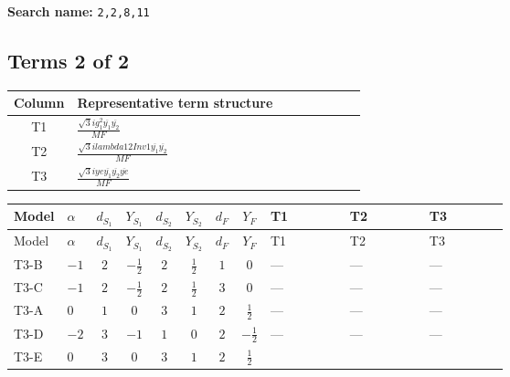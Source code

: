 \documentclass[8pt]{article}
\begin{document}
\begin{landscape}
\begin{longtable}{@{}llcccccc >{\raggedright\arraybackslash}p{0.21\linewidth} >{\raggedright\arraybackslash}p{0.21\linewidth} >{\raggedright\arraybackslash}p{0.21\linewidth}@{}}
\midrule
\bottomrule
\end{longtable}
\clearpage
\noindent\textbf{Search name: }\texttt{2,2,8,11}\par\smallskip
\subsection*{Terms 2 of 2}
\begin{center}
\begin{tabular}{@{}c >{\raggedright\arraybackslash}p{0.82\linewidth}@{}}
\toprule
Column & Representative term structure \\
\midrule
T1 & \(\displaystyle \frac{\sqrt{3} i g_{1}^{2} \overline{y_{1}} \overline{y_{2}}}{MF}\) \\
\midrule
T2 & \(\displaystyle \frac{\sqrt{3} i lambda12Inv1 \overline{y_{1}} \overline{y_{2}}}{MF}\) \\
\midrule
T3 & \(\displaystyle \frac{\sqrt{3} i ye \overline{y_{1}} \overline{y_{2}} \overline{ye}}{MF}\) \\
\midrule
\bottomrule
\end{tabular}
\end{center}
\smallskip
\tiny
\begin{longtable}{@{}llcccccc >{\raggedright\arraybackslash}p{0.21\linewidth} >{\raggedright\arraybackslash}p{0.21\linewidth} >{\raggedright\arraybackslash}p{0.21\linewidth}@{}}
\toprule
Model & $\alpha$ & $d_{S_1}$ & $Y_{S_1}$ & $d_{S_2}$ & $Y_{S_2}$ & $d_F$ & $Y_F$ & T1 & T2 & T3 \\
\midrule
\endfirsthead
\toprule
Model & $\alpha$ & $d_{S_1}$ & $Y_{S_1}$ & $d_{S_2}$ & $Y_{S_2}$ & $d_F$ & $Y_F$ & T1 & T2 & T3 \\
\midrule
\endhead
T3-B & $-1$ & $2$ & $-\frac{1}{2}$ & $2$ & $\frac{1}{2}$ & $1$ & $0$ & --- & --- & --- \\
\midrule
T3-C & $-1$ & $2$ & $-\frac{1}{2}$ & $2$ & $\frac{1}{2}$ & $3$ & $0$ & --- & --- & --- \\
\midrule
T3-A & $0$ & $1$ & $0$ & $3$ & $1$ & $2$ & $\frac{1}{2}$ & --- & --- & --- \\
\midrule
T3-D & $-2$ & $3$ & $-1$ & $1$ & $0$ & $2$ & $-\frac{1}{2}$ & --- & --- & --- \\
\midrule
T3-E & $0$ & $3$ & $0$ & $3$ & $1$ & $2$ & $\frac{1}{2}$ & \scriptsize\adjustbox{max width=\linewidth}{$\begin{gathered} - \frac{\sqrt{3} i g_{1}^{2} \overline{y_{1}} \overline{y_{2}}}{8 MF}\end{gathered}$} & \scriptsize\adjustbox{max width=\linewidth}{$\begin{gathered} \frac{\sqrt{3} i lambda12Inv1 \overline{y_{1}} \overline{y_{2}}}{6 MF}\end{gathered}$} & \scriptsize\adjustbox{max width=\linewidth}{$\begin{gathered} \frac{\sqrt{3} i ye \overline{y_{1}} \overline{y_{2}} \overline{ye}}{12 MF}\end{gathered}$} \\

\end{longtable}
\end{landscape}
\end{document}
